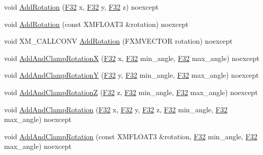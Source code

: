 \begin{DoxyCompactItemize}
void \hyperlink{structmage_1_1_transform_node_a38853632e217f1538ee8d232eaa24205}{Add\+Rotation} (\hyperlink{namespacemage_aa97e833b45f06d60a0a9c4fc22ae02c0}{F32} x, \hyperlink{namespacemage_aa97e833b45f06d60a0a9c4fc22ae02c0}{F32} y, \hyperlink{namespacemage_aa97e833b45f06d60a0a9c4fc22ae02c0}{F32} z) noexcept
\item 
void \hyperlink{structmage_1_1_transform_node_a4851628300467126db36aa28e6e2aa63}{Add\+Rotation} (const X\+M\+F\+L\+O\+A\+T3 \&rotation) noexcept
\item 
void X\+M\+\_\+\+C\+A\+L\+L\+C\+O\+NV \hyperlink{structmage_1_1_transform_node_af0bc80ccd27d20204e73496cdb68e14b}{Add\+Rotation} (F\+X\+M\+V\+E\+C\+T\+OR rotation) noexcept
\item 
void \hyperlink{structmage_1_1_transform_node_a5ae080b77bdbfba4f90d6b102d902044}{Add\+And\+Clamp\+RotationX} (\hyperlink{namespacemage_aa97e833b45f06d60a0a9c4fc22ae02c0}{F32} x, \hyperlink{namespacemage_aa97e833b45f06d60a0a9c4fc22ae02c0}{F32} min\+\_\+angle, \hyperlink{namespacemage_aa97e833b45f06d60a0a9c4fc22ae02c0}{F32} max\+\_\+angle) noexcept
\item 
void \hyperlink{structmage_1_1_transform_node_a713addf2de315ca49e81da378cdc7fa6}{Add\+And\+Clamp\+RotationY} (\hyperlink{namespacemage_aa97e833b45f06d60a0a9c4fc22ae02c0}{F32} y, \hyperlink{namespacemage_aa97e833b45f06d60a0a9c4fc22ae02c0}{F32} min\+\_\+angle, \hyperlink{namespacemage_aa97e833b45f06d60a0a9c4fc22ae02c0}{F32} max\+\_\+angle) noexcept
\item 
void \hyperlink{structmage_1_1_transform_node_a3b11eaf107656551939f824a089a117f}{Add\+And\+Clamp\+RotationZ} (\hyperlink{namespacemage_aa97e833b45f06d60a0a9c4fc22ae02c0}{F32} z, \hyperlink{namespacemage_aa97e833b45f06d60a0a9c4fc22ae02c0}{F32} min\+\_\+angle, \hyperlink{namespacemage_aa97e833b45f06d60a0a9c4fc22ae02c0}{F32} max\+\_\+angle) noexcept
\item 
void \hyperlink{structmage_1_1_transform_node_ab12f50db5ea7b78b17c5fb580b6bbdcd}{Add\+And\+Clamp\+Rotation} (\hyperlink{namespacemage_aa97e833b45f06d60a0a9c4fc22ae02c0}{F32} x, \hyperlink{namespacemage_aa97e833b45f06d60a0a9c4fc22ae02c0}{F32} y, \hyperlink{namespacemage_aa97e833b45f06d60a0a9c4fc22ae02c0}{F32} z, \hyperlink{namespacemage_aa97e833b45f06d60a0a9c4fc22ae02c0}{F32} min\+\_\+angle, \hyperlink{namespacemage_aa97e833b45f06d60a0a9c4fc22ae02c0}{F32} max\+\_\+angle) noexcept
\item 
void \hyperlink{structmage_1_1_transform_node_a7555718be074fe48c3a2f0f262833bc6}{Add\+And\+Clamp\+Rotation} (const X\+M\+F\+L\+O\+A\+T3 \&rotation, \hyperlink{namespacemage_aa97e833b45f06d60a0a9c4fc22ae02c0}{F32} min\+\_\+angle, \hyperlink{namespacemage_aa97e833b45f06d60a0a9c4fc22ae02c0}{F32} max\+\_\+angle) noexcept

\end{DoxyCompactItemize}
